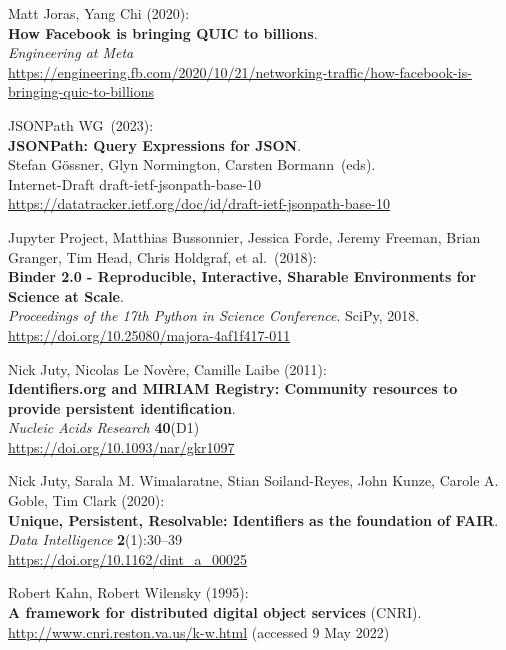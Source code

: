 \begin{thebibliography}{9}
Matt Joras, Yang Chi (2020): \\
\textbf{How Facebook is bringing QUIC to billions}.\\
\emph{Engineering at Meta}\\
\url{https://engineering.fb.com/2020/10/21/networking-traffic/how-facebook-is-bringing-quic-to-billions}

JSONPath WG~(2023):\\
\textbf{JSONPath: Query Expressions for JSON}.\\
Stefan Gössner, Glyn Normington, Carsten Bormann~(eds).\\
Internet-Draft draft-ietf-jsonpath-base-10\\
\url{https://datatracker.ietf.org/doc/id/draft-ietf-jsonpath-base-10}

Jupyter Project, Matthias Bussonnier, Jessica Forde, Jeremy
Freeman, Brian Granger, Tim Head, Chris Holdgraf, et al.~(2018):\\
\textbf{Binder 2.0 - Reproducible, Interactive, Sharable Environments
for Science at Scale}.\\
\emph{Proceedings of the 17th Python in Science
Conference}. SciPy, 2018.\\
\url{https://doi.org/10.25080/majora-4af1f417-011}

Nick Juty, Nicolas Le Novère, Camille Laibe (2011): \\
\textbf{Identifiers.org and {MIRIAM Registry}: Community resources to provide persistent identification}.\\
\emph{Nucleic Acids Research} \textbf{40}(D1) \\
\url{https://doi.org/10.1093/nar/gkr1097}

Nick Juty, Sarala M. Wimalaratne, Stian Soiland-Reyes, John Kunze, Carole A. Goble, Tim Clark (2020):\\
\textbf{Unique, Persistent, Resolvable: Identifiers as the foundation of FAIR}.
\emph{Data Intelligence} \textbf{2}(1):30–39\\
\url{https://doi.org/10.1162/dint_a_00025}

Robert Kahn, Robert Wilensky (1995): \\
\textbf{A framework for distributed digital object services} (CNRI).\\
\url{http://www.cnri.reston.va.us/k-w.html} (accessed 9 May 2022)



\end{thebibliography}
